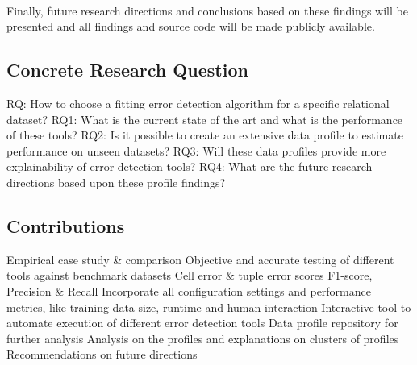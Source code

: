 ~\\Finally, future research directions and conclusions based on these findings will be presented and all findings and source code will be made publicly available. 


\subsection*{Concrete Research Question} %

\begin{outline}
    \1 RQ: How to choose a fitting error detection algorithm for a specific relational dataset?
        \2 RQ1: What is the current state of the art and what is the performance of these tools?
        \2 RQ2: Is it possible to create an extensive data profile to estimate performance on unseen datasets?
        \2 RQ3: Will these data profiles provide more explainability of error detection tools?
        \2 RQ4: What are the future research directions based upon these profile findings?
\end{outline}


\subsection*{Contributions} %

\begin{outline}
    \1 Empirical case study \& comparison
        \2 Objective and accurate testing of different tools against benchmark datasets
        \2 Cell error \& tuple error scores
        \2 F1-score, Precision \& Recall
        \2 Incorporate all configuration settings and performance metrics, like training data size, runtime and human interaction
    \1 Interactive tool to automate execution of different error detection tools
    \1 Data profile repository for further analysis
        \2 Analysis on the profiles and explanations on clusters of profiles
    \1 Recommendations on future directions
\end{outline}